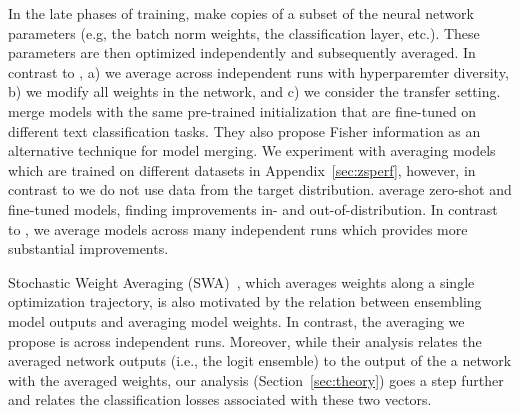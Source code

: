 \documentclass[nohyperref]{article}
\theoremstyle{plain}
\theoremstyle{definition}
\theoremstyle{remark}
\begin{document}
        In the late phases of training, \citet{von2020neural} make copies of a subset of the neural network parameters (e.g, the batch norm weights, the classification layer, etc.). These parameters are then optimized independently and subsequently averaged. In contrast to \citet{von2020neural}, a) we average across independent runs with hyperparemter diversity, b) we modify all weights in the network, and c) we consider the transfer setting.
        \citet{matena2021merging} merge models with the same pre-trained initialization that are
        fine-tuned on different text classification tasks.
        They also propose Fisher information as an alternative technique for model merging.
        We experiment with averaging models which are trained on different datasets in Appendix~\ref{sec:zsperf}, however, in contrast to \citet{matena2021merging} we do not use data from the target distribution.
        \citet{wortsman2021robust} average zero-shot and fine-tuned models, finding improvements in- and out-of-distribution.
        In contrast to \citet{wortsman2021robust}, we average models across many independent runs which provides more substantial improvements.
        
        Stochastic Weight Averaging (SWA)~\cite{izmailov2018averaging}, which averages weights along a single optimization trajectory, is also motivated by the relation between ensembling model outputs and averaging model weights. In contrast, the averaging we propose is across independent runs. Moreover, while their analysis relates the averaged network outputs (i.e., the logit ensemble) to the output of the a network with the averaged weights, our analysis (Section~\ref{sec:theory}) goes a step further and relates the classification losses associated with these two vectors.
        
\end{document}
